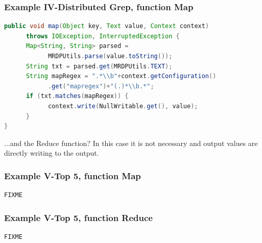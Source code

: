 \documentclass[xcolor=dvipsnames,dvip,notes=show,table]{beamer}
\begin{document}
\begin{frame}[fragile]
  \frametitle{Example IV-Distributed Grep, function Map}

\begin{lstlisting}[language=Java]
public void map(Object key, Text value, Context context)
      throws IOException, InterruptedException {
      Map<String, String> parsed = 
            MRDPUtils.parse(value.toString());
      String txt = parsed.get(MRDPUtils.TEXT);
      String mapRegex = ".*\\b"+context.getConfiguration()
            .get("mapregex")+"(.)*\\b.*";
      if (txt.matches(mapRegex)) {
            context.write(NullWritable.get(), value);
      }
}
\end{lstlisting}
\tiny

\begin{alertblock}{...and the Reduce function?}
 In this case it is not necessary and output values are directly writing to the output.
\end{alertblock}

\end{frame}







\begin{frame}[fragile]
  \frametitle{Example V-Top 5, function Map}

\begin{lstlisting}[language=Java]
FIXME
\end{lstlisting}

\end{frame}

\begin{frame}[fragile]
  \frametitle{Example V-Top 5, function Reduce}

\begin{lstlisting}[language=Java]
FIXME
\end{lstlisting}

\end{frame}
\end{document}
